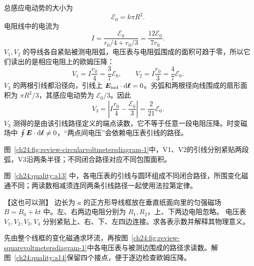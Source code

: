 {\begin{xesolution}
总感应电动势的大小为
\begin{equation}
  \mathcal E_0=k\pi R^2.
\end{equation}
电阻线中的电流为
\begin{equation}
  I=\frac{\mathcal E_0}{r_0/4+r_0/3}
  =\frac{12\mathcal E_0}{7r_0}.
\end{equation}
$V_1,V_2$ 的导线各自紧贴被测电阻弧，电压表与电阻弧围成的面积可趋于零，所以它们读出的是相应电阻上的欧姆压降：
\begin{equation}
  \boxed{V_1=I\frac{r_0}{4}=\frac37\mathcal E_0},
  \qquad
  \boxed{V_2=I\frac{r_0}{3}=\frac47\mathcal E_0}.
\end{equation}
$V_3$ 的两根引线都沿径向，引线上 $\bm{E}_{\rm ind}\cdot\mathop{}\!\mathrm d\bm{\ell}=0$。劣弧和两根径向线围成的扇形面积为 $\pi R^2/3$，其感应电动势为 $\mathcal E_0/3$。因此
\begin{equation}
  \boxed{V_3=\left|I\frac{r_0}{4}-\frac{\mathcal E_0}{3}\right|
  =\frac{2}{21}\mathcal E_0}.
\end{equation}
$V_3$ 测得的是由该引线路径定义的端点读数，它不等于任意一段电阻压降。时变磁场中 $\oint\bm{E}\cdot\mathop{}\!\mathrm d\bm{\ell}\ne0$，“两点间电压”会依赖电压表引线的路径。

图~\ref{ch24:fig:review-circularvoltmetersdiagram-1}中，V1、V2的引线分别紧贴两段弧，V3沿两条半径；不同闭合路径对应不同包围面积。


图~\ref{ch24:quality:a13} 中，各电压表的引线与圆环组成不同闭合路径，所围变化磁通不同；两读数相减须连同两条引线路径一起使用法拉第定律。
\end{xesolution}



\begin{origexamplebox}{【这也可以测】}\label{ch24:ex:s40-9-14}
边长为 $a$ 的正方形导线框放在垂直纸面向里的匀强磁场 $B=B_0+kt$ 中。左、右两边电阻分别为 $R_1,R_2$，上、下两边电阻忽略。
电压表 $V_1,V_2,V_3,V_4$ 分别紧贴上、右、下、左四边连接。求各表示数并解释其物理意义。
\par\noindent\begin{minipage}{\linewidth}
\squareVoltmetersDiagram
{}
\end{minipage}\par\medskip
\end{origexamplebox}

\begin{xesolution}
先由整个线框的变化磁通求环流，再按图~\ref{ch24:fig:review-squarevoltmetersdiagram-1}中各电压表与被测边围成的路径求读数。解图~\ref{ch24:quality:a14}保留四个接点，便于逐边检查欧姆压降。



\end{xesolution}}
